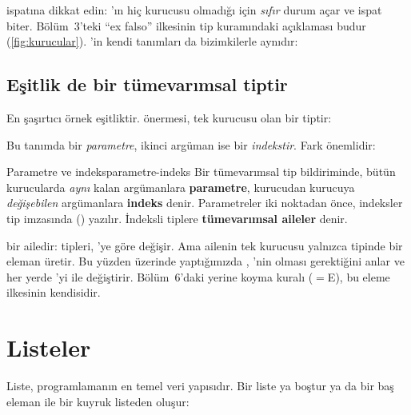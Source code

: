 
\noindent {} ispatına dikkat edin: 'ın hiç
kurucusu olmadığı için  \emph{sıfır} durum açar ve
ispat biter. Bölüm~3'teki ``ex falso'' ilkesinin tip kuramındaki açıklaması
budur (\cref{fig:kurucular}). \Lean{}'in kendi tanımları da bizimkilerle
aynıdır:


\subsection{Eşitlik de bir tümevarımsal tiptir}

En şaşırtıcı örnek eşitliktir.  önermesi, tek kurucusu
 olan bir tiptir:


\noindent Bu tanımda  bir \emph{parametre}, ikinci argüman ise bir
\emph{indekstir}. Fark önemlidir:

\begin{tanim}{Parametre ve indeks}{parametre-indeks}
Bir tümevarımsal tip bildiriminde, bütün kurucularda \emph{aynı} kalan
argümanlara \textbf{parametre}, kurucudan kurucuya \emph{değişebilen}
argümanlara \textbf{indeks} denir. Parametreler iki noktadan önce, indeksler
tip imzasında () yazılır. İndeksli tiplere
\textbf{tümevarımsal aileler} denir.
\end{tanim}

 bir ailedir:  tipleri, 'ye göre değişir.
Ama ailenin tek kurucusu yalnızca  tipinde bir eleman
üretir. Bu yüzden  üzerinde  yaptığımızda
\Lean{}, 'nin  olması gerektiğini anlar ve her yerde 'yi
 ile değiştirir. Bölüm~6'daki yerine koyma kuralı ($=$E), bu
eleme ilkesinin kendisidir.

\section{Listeler}\label{sec:listeler}

Liste, programlamanın en temel veri yapısıdır. Bir liste ya boştur ya da
bir baş eleman ile bir kuyruk listeden oluşur:


